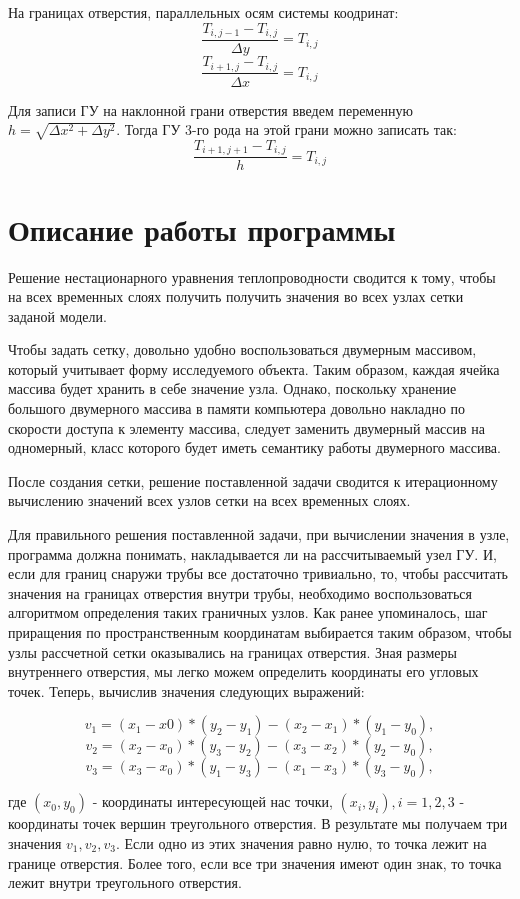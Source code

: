 \documentclass[12pt, a4paper]{article}
\begin{document}
	На границах отверстия, параллельных осям системы коодринат:
	\[
	\frac{T_{i,j-1} - T_{i,j}}{\Delta y} = T_{i,j}
	\]
	\[
	\frac{T_{i+1,j} - T_{i,j}}{\Delta x} = T_{i,j}
	\]
	
	Для записи ГУ на наклонной грани отверстия введем переменную $h = \sqrt{\Delta x^2 + \Delta y^2}$. Тогда ГУ 3-го рода на этой грани можно записать так:
	\[
	\frac{T_{i+1,j+1} - T_{i,j}}{h} = T_{i,j}
	\]
	
	\section{Описание работы программы}
	
	Решение нестационарного уравнения теплопроводности сводится к тому, чтобы на всех временных слоях получить получить значения во всех узлах сетки заданой модели.
	
	Чтобы задать сетку, довольно удобно воспользоваться двумерным массивом, который учитывает форму исследуемого объекта. Таким образом, каждая ячейка массива будет хранить в себе значение узла. Однако, поскольку хранение большого двумерного массива в памяти компьютера довольно накладно по скорости доступа к элементу массива, следует заменить двумерный массив на одномерный, класс которого будет иметь семантику работы двумерного массива.
	
	После создания сетки, решение поставленной задачи сводится к итерационному вычислению значений всех узлов сетки на всех временных слоях.
	
	Для правильного решения поставленной задачи, при вычислении значения в узле, программа должна понимать, накладывается ли на рассчитываемый узел ГУ. И, если для границ снаружи трубы все достаточно тривиально, то, чтобы рассчитать значения на границах отверстия внутри трубы, необходимо воспользоваться алгоритмом определения таких граничных узлов. Как ранее упоминалось, шаг приращения по пространственным координатам выбирается таким образом, чтобы узлы рассчетной сетки оказывались на границах отверстия. Зная размеры внутреннего отверстия, мы легко можем определить координаты его угловых точек. Теперь, вычислив значения следующих выражений:
	
	\[
	v_1 = (x_1-x0)*(y_2-y_1)-(x_2-x_1)*(y_1-y_0),
	\]
	\[
	v_2 = (x_2-x_0)*(y_3-y_2)-(x_3-x_2)*(y_2-y_0),
	\]
	\[
	v_3 = (x_3-x_0)*(y_1-y_3)-(x_1-x_3)*(y_3-y_0),
	\]
	
	где $(x_0, y_0)$ - координаты интересующей нас точки, $(x_i, y_i), i = 1, 2, 3$ - координаты точек вершин треугольного отверстия. В результате мы получаем три значения $v_1, v_2, v_3$. Если одно из этих значения равно нулю, то точка лежит на границе отверстия. Более того, если все три значения имеют один знак, то точка лежит внутри треугольного отверстия.
	
\end{document}
